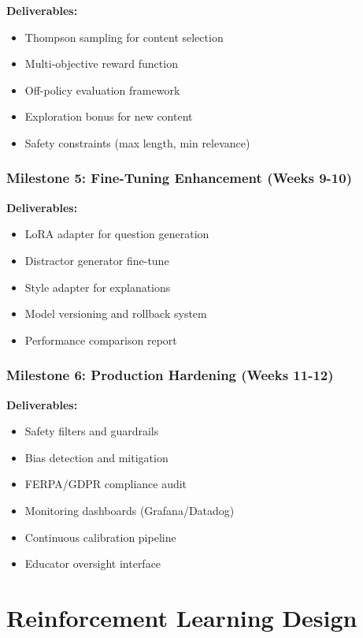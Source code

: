 \documentclass[11pt,a4paper]{report}
\begin{document}
\textbf{Deliverables:}
\begin{itemize}
    \item Thompson sampling for content selection
    \item Multi-objective reward function
    \item Off-policy evaluation framework
    \item Exploration bonus for new content
    \item Safety constraints (max length, min relevance)
\end{itemize}

\subsection{Milestone 5: Fine-Tuning Enhancement (Weeks 9-10)}

\textbf{Deliverables:}
\begin{itemize}
    \item LoRA adapter for question generation
    \item Distractor generator fine-tune
    \item Style adapter for explanations
    \item Model versioning and rollback system
    \item Performance comparison report
\end{itemize}

\subsection{Milestone 6: Production Hardening (Weeks 11-12)}

\textbf{Deliverables:}
\begin{itemize}
    \item Safety filters and guardrails
    \item Bias detection and mitigation
    \item FERPA/GDPR compliance audit
    \item Monitoring dashboards (Grafana/Datadog)
    \item Continuous calibration pipeline
    \item Educator oversight interface
\end{itemize}

\chapter{Reinforcement Learning Design}
\end{document}
